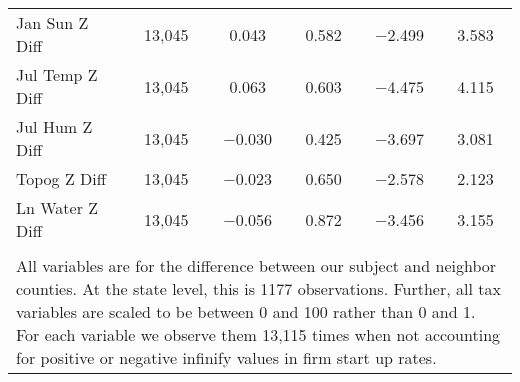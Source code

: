 \begin{table}[!htbp]
\begin{tabular}{@{\extracolsep{5pt}}lccccc}
Jan Sun Z Diff & 13,045 & 0.043 & 0.582 & $-$2.499 & 3.583 \\ 
Jul Temp Z Diff & 13,045 & 0.063 & 0.603 & $-$4.475 & 4.115 \\ 
Jul Hum Z Diff & 13,045 & $-$0.030 & 0.425 & $-$3.697 & 3.081 \\ 
Topog Z Diff & 13,045 & $-$0.023 & 0.650 & $-$2.578 & 2.123 \\ 
Ln Water Z Diff & 13,045 & $-$0.056 & 0.872 & $-$3.456 & 3.155 \\ 
\hline \\[-1.8ex] 
\multicolumn{6}{l}{All variables are for the difference between our subject and neighbor counties. At the state level, this is 1177 observations. Further, all tax variables are scaled to be between 0 and 100 rather than 0 and 1. For each variable we observe them 13,115 times when not accounting for positive or negative infinify values in firm start up rates.} \\ 
\end{tabular} 
\end{table} 
